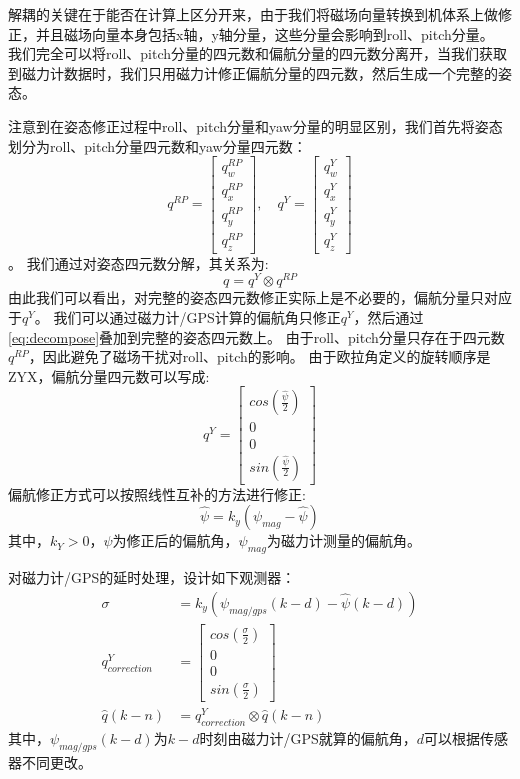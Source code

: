 \documentclass[
  type=master
]{gdutthesis}
\begin{document}
解耦的关键在于能否在计算上区分开来，由于我们将磁场向量转换到机体系上做修正，并且磁场向量本身包括x轴，y轴分量，这些分量会影响到roll、pitch分量。
我们完全可以将roll、pitch分量的四元数和偏航分量的四元数分离开，当我们获取到磁力计数据时，我们只用磁力计修正偏航分量的四元数，然后生成一个完整的姿态。

注意到在姿态修正过程中roll、pitch分量和yaw分量的明显区别，我们首先将姿态划分为roll、pitch分量四元数和yaw分量四元数：
\[
q^{RP} = 
\begin{bmatrix}
	q_w^{RP} \\
	q_x^{RP} \\
	q_y^{RP} \\
	q_z^{RP}
\end{bmatrix},
\hspace{1em}
q^{Y} = 
\begin{bmatrix}
	q_w^{Y} \\
	q_x^{Y} \\
	q_y^{Y} \\
	q_z^{Y}
\end{bmatrix}
\]。
我们通过对姿态四元数分解，其关系为:
\begin{equation}\label{eq:decompose}
	q = q^{Y} \otimes q^{RP}	
\end{equation}
由此我们可以看出，对完整的姿态四元数修正实际上是不必要的，偏航分量只对应于$q^{Y}$。
我们可以通过磁力计/GPS计算的偏航角只修正$q^{Y}$，然后通过\autoref{eq:decompose}叠加到完整的姿态四元数上。
由于roll、pitch分量只存在于四元数$q^{RP}$，因此避免了磁场干扰对roll、pitch的影响。
由于欧拉角定义的旋转顺序是ZYX，偏航分量四元数可以写成:
\begin{equation}
	q^{Y} = 
	\begin{bmatrix}
		cos(\frac{\hat{\psi}}{2}) \\
		0 \\
		0 \\
		sin(\frac{\hat{\psi}}{2})
	\end{bmatrix}	
\end{equation}
偏航修正方式可以按照线性互补的方法进行修正:
\begin{equation}
	\hat{\psi} = k_y (\psi_{mag} - \hat{\psi}) 	
\end{equation}
其中，$k_Y > 0$，$\hat{\psi}$为修正后的偏航角，$\psi_{mag}$为磁力计测量的偏航角。

对磁力计/GPS的延时处理，设计如下观测器：
\begin{equation}\label{eq:myyawcorrection}
	\begin{aligned}
		\sigma &= k_y (\psi_{mag/gps}(k-d) - \hat{\psi}(k-d)) \\
		q_{correction}^{Y} &= \begin{bmatrix}
			cos(\frac{\sigma}{2}) \\
			0 \\
			0 \\
			sin(\frac{\sigma}{2})
		\end{bmatrix}\\
		\hat{q}(k-n) &= q_{correction}^{Y} \otimes \hat{q}(k-n)
	\end{aligned}
\end{equation}
其中，$\psi_{mag/gps}(k-d)$为$k-d$时刻由磁力计/GPS就算的偏航角，$d$可以根据传感器不同更改。
\end{document}
